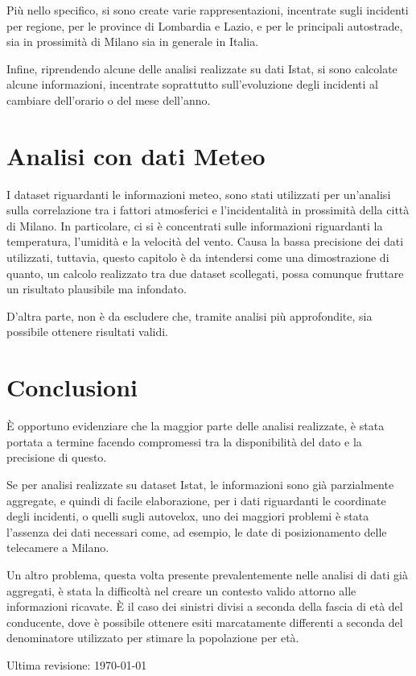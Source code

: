 \documentclass[a4paper]{article}
\begin{document}
Più nello specifico, si sono create varie rappresentazioni, incentrate sugli incidenti 
per regione, per le province di Lombardia e Lazio, e per le principali autostrade, sia in 
prossimità di Milano sia in generale in Italia.

Infine, riprendendo alcune delle analisi realizzate su dati Istat, si sono calcolate alcune 
informazioni, incentrate soprattutto sull'evoluzione degli incidenti al cambiare dell'orario 
o del mese dell'anno.

\section{Analisi con dati Meteo}

I dataset riguardanti le informazioni meteo, sono stati utilizzati per un'analisi sulla 
correlazione tra i fattori atmosferici e l'incidentalità in 
prossimità della città di Milano. 
In particolare, ci si è concentrati sulle informazioni riguardanti la temperatura, 
l'umidità e la velocità del vento. 
Causa la bassa precisione dei dati utilizzati, tuttavia, questo capitolo è 
da intendersi come una dimostrazione di quanto, un calcolo realizzato tra due dataset 
scollegati, possa comunque fruttare un risultato plausibile ma infondato. 

D'altra parte, non è da escludere che, tramite analisi più approfondite, 
sia possibile ottenere risultati validi.

\section{Conclusioni}

\`E opportuno evidenziare che la maggior parte delle analisi realizzate, 
è stata portata a termine facendo compromessi tra la disponibilità del dato e la 
precisione di questo. 

Se per analisi realizzate su dataset Istat, le informazioni sono già parzialmente aggregate, 
e quindi di facile elaborazione, per i dati riguardanti le coordinate degli incidenti, 
o quelli sugli autovelox, uno dei maggiori problemi è stata l'assenza dei dati necessari come, 
ad esempio, le date di posizionamento delle telecamere a Milano. 

Un altro problema, questa volta presente prevalentemente nelle analisi di dati già aggregati, 
è stata la difficoltà nel creare un contesto valido attorno alle informazioni ricavate. 
\`E il caso dei sinistri divisi a seconda della fascia di età del conducente, dove è possibile 
ottenere esiti marcatamente differenti a seconda del denominatore utilizzato per 
stimare la popolazione per età.

\printbibliography

\raggedleft\vfill\scriptsize Ultima revisione: \today\par
\end{document}

